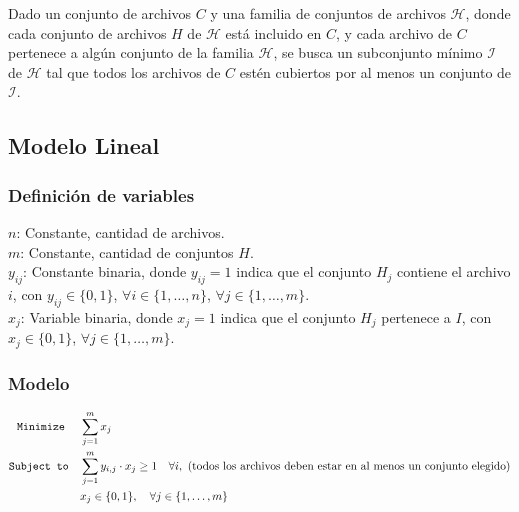 \documentclass[11pt, a4paper, pdftex]{article}
\begin{document}
Dado un conjunto de archivos $C$ y una familia de conjuntos de archivos
$\mathcal{H}$, donde cada conjunto de archivos $H$ de $\mathcal{H}$ está
incluido en $C$, y cada archivo de $C$ pertenece a algún conjunto de la familia
$\mathcal{H}$, se busca un subconjunto mínimo $\mathcal{I}$ de $\mathcal{H}$
tal que todos los archivos de $C$ estén cubiertos por al menos un conjunto de
$\mathcal{I}$.

\subsection{Modelo Lineal}

\subsubsection{Definición de variables}

\noindent $n$: Constante, cantidad de archivos. \\

\noindent $m$: Constante, cantidad de conjuntos $H$. \\

\noindent $y_{ij}$: Constante binaria, donde $y_{ij} = 1$ indica que el conjunto $H_{j}$ contiene el archivo $i$, con $y_{ij} \in \{0, 1\}$, $\forall i \in \{1, \ldots, n\}$, $\forall j \in \{1, \ldots, m\}$. \\

\noindent $x_{j}$: Variable binaria, donde $x_{j} = 1$ indica que el conjunto $H_{j}$ pertenece a $I$, con $x_{j} \in \{0, 1\}$, $\forall j \in \{1, \ldots, m\}$. \\


\subsubsection{Modelo}

\begin{alignat*}{2}
    \texttt{Minimize}\quad\,\, & \sum_{j = 1}^{m} x_{j}\\
    \texttt{Subject to}\quad   & \sum_{j=1}^{m} y_{i,j} \cdot x_j \geq 1 \quad \forall i,\ \text{(todos los archivos deben estar en al menos un conjunto elegido)}\\
              & x_{j} \in \{0,1\}, \quad \forall j \in \{1, \ldots, m\} \\
\end{alignat*}
\end{document}
